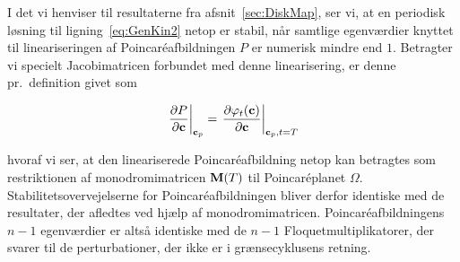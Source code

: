 I det vi henviser til resultaterne fra
afsnit~\ref{sec:DiskMap}, ser vi, at en periodisk
l{\o}sning til ligning~\ref{eq:GenKin2} netop er stabil,
n{\aa}r samtlige egenv{\ae}rdier knyttet til
lineariseringen af Poincar\'{e}afbild\-ningen $P$ er numerisk
mindre end $1$. Betragter vi specielt Jacobimatricen
forbundet med denne linearisering, er denne pr.\ definition
givet som

\begin{equation}
 \left.\frac{\partial P}{\partial {\bf c}}\right|_{{\bf c}_p} =
 \left.\frac{\partial \varphi_t({\bf c})}
            {\partial {\bf c}}\right|_{{\bf c}_p,t=T} 
\end{equation}

hvoraf vi ser, at den lineariserede
Poincar\'{e}afbild\-ning netop kan betragtes som
restriktionen af monodromimatricen ${\bf M}(T)$ til
Poincar\'{e}planet $\Omega$. Stabilitets\-overvejelserne
for Poincar\'{e}afbild\-ningen bliver derfor identiske med
de resultater, der afledtes ved hj{\ae}lp af
monodromimatricen. Poincar\'{e}afbild\-ningens $n-1$
egenv{\ae}rdier er alts{\aa} identiske med de $n-1$
Floquetmultiplikatorer, der svarer til de perturbationer,
der ikke er i gr{\ae}nsecyklusens retning.

